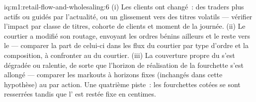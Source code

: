 \begin{solution}{iq:m1:retail-flow-and-wholesaling:6}
(i) Les clients ont changé~: des traders plus actifs ou guidés par l'actualité, ou un glissement
vers des titres volatils --- vérifier l'impact par classe de titres, cohorte de clients et
moment de la journée. (ii) Le courtier a modifié son routage, envoyant les ordres bénins
ailleurs et le reste vers le  --- comparer la part de celui-ci dans les flux du courtier par
type d'ordre et la composition, à confronter au  du courtier. (iii) La couverture propre du 
s'est dégradée ou ralentie, de sorte que l'horizon de réalisation de la fourchette
s'est allongé --- comparer les markouts à horizons fixes (inchangés dans cette hypothèse)
au  par action. Une quatrième piste~: les fourchettes cotées se sont resserrées
tandis que l' est restée fixe en centimes.
\end{solution}
